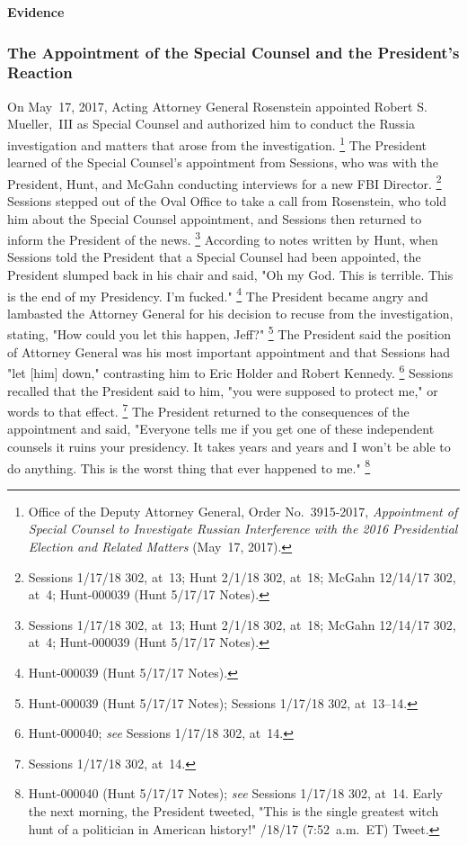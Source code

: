 \begin{center}
\textbf{Evidence}
\end{center}

\subsubsection{The Appointment of the Special Counsel and the President's Reaction}

On May~17, 2017, Acting Attorney General Rosenstein appointed Robert S. Mueller,~III as Special Counsel and authorized him to conduct the Russia investigation and matters that arose from the investigation.%
\footnote{Office of the Deputy Attorney General, Order No.~3915-2017, \textit{Appointment of Special Counsel to Investigate Russian Interference with the 2016 Presidential Election and Related Matters} (May~17, 2017).}
The President learned of the Special Counsel's appointment from Sessions, who was with the President, Hunt, and McGahn conducting interviews for a new FBI Director.%
\footnote{Sessions 1/17/18 302, at~13;
Hunt 2/1/18 302, at~18;
McGahn 12/14/17 302, at~4;
Hunt-000039 (Hunt 5/17/17 Notes).}
Sessions stepped out of the Oval Office to take a call from Rosenstein, who told him about the Special Counsel appointment, and Sessions then returned to inform the President of the news.%
\footnote{Sessions 1/17/18 302, at~13;
Hunt 2/1/18 302, at~18;
McGahn 12/14/17 302, at~4;
Hunt-000039 (Hunt 5/17/17 Notes).}
According to notes written by Hunt, when Sessions told the President that a Special Counsel had been appointed, the President slumped back in his chair and said, "Oh my God.
This is terrible.
This is the end of my Presidency.
I'm fucked."%
\footnote{Hunt-000039 (Hunt 5/17/17 Notes).}
The President became angry and lambasted the Attorney General for his decision to recuse from the investigation, stating, "How could you let this happen, Jeff?"%
\footnote{Hunt-000039 (Hunt 5/17/17 Notes);
Sessions 1/17/18 302, at~13--14.}
The President said the position of Attorney General was his most important appointment and that Sessions had "let [him] down," contrasting him to Eric Holder and Robert Kennedy.%
\footnote{Hunt-000040;
\textit{see} Sessions 1/17/18 302, at~14.}
Sessions recalled that the President said to him, "you were supposed to protect me," or words to that effect.%
\footnote{Sessions 1/17/18 302, at~14.}
The President returned to the consequences of the appointment and said, "Everyone tells me if you get one of these independent counsels it ruins your presidency.
It takes years and years and I won't be able to do anything.
This is the worst thing that ever happened to me."%
\footnote{Hunt-000040 (Hunt 5/17/17 Notes);
\textit{see} Sessions 1/17/18 302, at~14.
Early the next morning, the President tweeted, "This is the single greatest witch hunt of a politician in American history!"
/18/17 (7:52~a.m.~ET) Tweet.}

